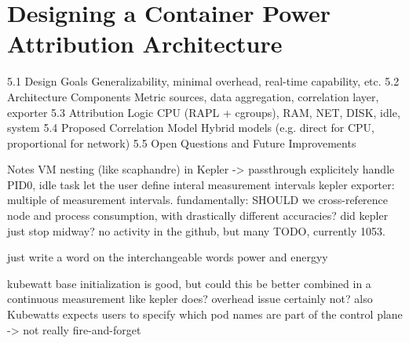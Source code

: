 \chapter{Designing a Container Power Attribution Architecture} %
\label{Chapter5}


    5.1 Design Goals
        Generalizability, minimal overhead, real-time capability, etc.
    5.2 Architecture Components
        Metric sources, data aggregation, correlation layer, exporter
    5.3 Attribution Logic
        CPU (RAPL + cgroups), RAM, NET, DISK, idle, system
    5.4 Proposed Correlation Model
        Hybrid models (e.g. direct for CPU, proportional for network)
    5.5 Open Questions and Future Improvements


Notes
    VM nesting (like scaphandre) in Kepler -> passthrough
    explicitely handle PID0, idle task
    let the user define interal measurement intervals
        kepler exporter: multiple of measurement intervals.
    fundamentally: SHOULD we cross-reference node and process consumption, with drastically different accuracies?
    did kepler just stop midway? no activity in the github, but many TODO, currently 1053.


    just write a word on the interchangeable words power and energyy

    kubewatt base initialization is good, but could this be better combined in a continuous measurement like kepler does? overhead issue certainly not?
    also Kubewatts expects users to specify which pod names are part of the control plane -> not really fire-and-forget